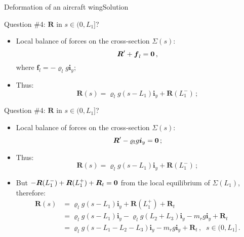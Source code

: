 \documentclass{beamer}
\newcommand{\yj}{y}
\renewcommand{\ij}{i}
\newcommand{\iv}{{\boldsymbol\ij}}
\newcommand{\fj}{f}
\newcommand{\fv}{{\boldsymbol\fj}}
\newcommand{\roi}{\varrho}
\newcommand{\Fresj}{R}
\newcommand{\Fres}{{\boldsymbol\Fresj}}
\newcommand{\bzero}{{\bf 0}}
\begin{document}
\begin{frame}{Deformation of an aircraft wing}{Solution}

\begin{overprint}

\vskip-20pt
\begin{exampleblock}{Question \#4: $\Fres$ in $s\in(0,L_1]$?}
\begin{itemize}
\item Local balance of forces on the cross-section $\Sigma(s)$:
\begin{displaymath}
\Fres'+\fv_l=\bzero\,,
\end{displaymath}
where $\fv_l=-\roi_l g\iv_\yj$;
\item Thus:
\begin{displaymath}
\Fres(s)=\roi_l g(s-L_1)\iv_\yj +\Fres(L_1^-)\,;
\end{displaymath}
\end{itemize}
\end{exampleblock}

\vskip-20pt
\begin{exampleblock}{Question \#4: $\Fres$ in $s\in(0,L_1]$?}
\begin{itemize}
\item Local balance of forces on the cross-section $\Sigma(s)$:
\begin{displaymath}
\Fres'-\roi_l g\iv_\yj=\bzero\,;
\end{displaymath}
\item Thus:
\begin{displaymath}
\Fres(s)=\roi_l g(s-L_1)\iv_\yj +\Fres(L_1^-)\,;
\end{displaymath}
\item But $-\Fres(L_1^-)+\Fres(L_1^+)+\Fres_t=\bzero$ from the local equilibrium of $\Sigma(L_1)$, therefore:
\begin{displaymath}
\begin{split}
\!\!\!\!\!\!\!\!\!\!\!\! \Fres(s) &=\roi_l g(s-L_1)\iv_\yj + \Fres(L_1^+)+\Fres_t \\
\!\!\!\!\!\!\!\!\!\!\!\!  &=\roi_l g(s-L_1)\iv_\yj - \roi_l g(L_2+L_3)\iv_\yj -m_r g\iv_\yj +\Fres_t \\
\!\!\!\!\!\!\!\!\!\!\!\!  &=\roi_l g(s-L_1-L_2-L_3)\iv_\yj-m_r g\iv_\yj+\Fres_t\,,\;\;s\in(0,L_1]\,.
\end{split}
\end{displaymath}
\end{itemize}
\end{exampleblock}


\end{overprint}
\end{frame}
\end{document}
